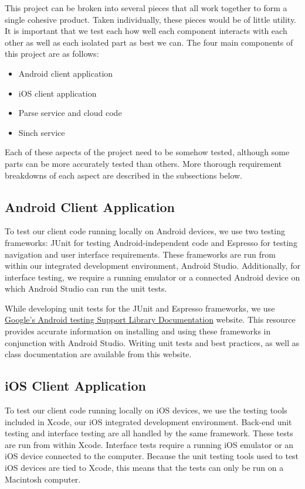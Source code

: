 This project can be broken into several pieces that all work together to form a
single cohesive product. Taken individually, these pieces would be of little
utility. It is important that we test each how well each component interacts
with each other as well as each isolated part as best we can. The four main
components of this project are as follows:

\begin{itemize}
	\item Android client application
	\item iOS client application
	\item Parse service and cloud code
	\item Sinch service
\end{itemize}

Each of these aspects of the project need to be somehow tested, although some
parts can be more accurately tested than others. More thorough requirement
breakdowns of each aspect are described in the subsections below.


\subsection{Android Client Application}

To test our client code running locally on Android devices, we use two testing
frameworks: JUnit for testing Android-independent code and Espresso for testing
navigation and user interface requirements. These frameworks are run from within
our integrated development environment, Android Studio. Additionally, for
interface testing, we require a running emulator or a connected Android device on
which Android Studio can run the unit tests.

While developing unit tests for the JUnit and Espresso frameworks, we use
\href{https://google.github.io/android-testing-support-library/docs/index.html}
{Google's Android testing Support Library Documentation} website. This resource
provides accurate information on installing and using these frameworks in
conjunction with Android Studio. Writing unit tests and best practices, as well
as class documentation are available from this website.


\subsection{iOS Client Application}

To test our client code running locally on iOS devices, we use the testing tools
included in Xcode, our iOS integrated development environment. Back-end unit
testing and interface testing are all handled by the same framework. These tests
are run from within Xcode. Interface tests require a running iOS emulator or an
iOS device connected to the computer. Because the unit testing tools used to
test iOS devices are tied to Xcode, this means that the tests can only be run on
a Macintosh computer.

